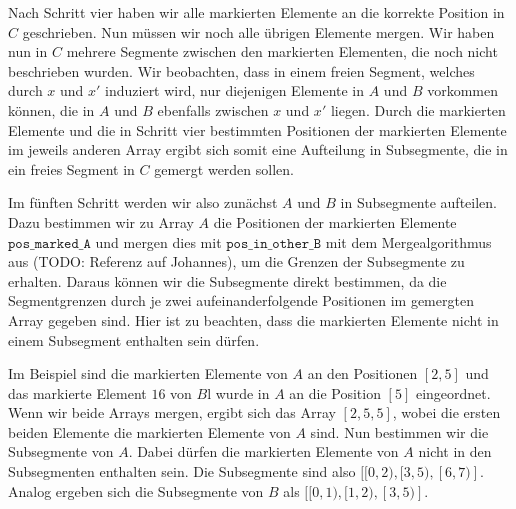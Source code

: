 Nach Schritt vier haben wir alle markierten Elemente an die korrekte Position in $C$ geschrieben. Nun müssen wir noch alle übrigen Elemente mergen. Wir haben nun in $C$ mehrere Segmente zwischen den markierten Elementen, die noch nicht beschrieben wurden. Wir beobachten, dass in einem freien Segment, welches durch $x$ und $x'$ induziert wird, nur diejenigen Elemente in $A$ und $B$ vorkommen können, die in $A$ und $B$ ebenfalls zwischen $x$ und $x'$ liegen. Durch die markierten Elemente und die in Schritt vier bestimmten Positionen der markierten Elemente im jeweils anderen Array ergibt sich somit eine Aufteilung in Subsegmente, die in ein freies Segment in $C$ gemergt werden sollen. \par
Im fünften Schritt werden wir also zunächst $A$ und $B$ in Subsegmente aufteilen. Dazu bestimmen wir zu Array $A$ die Positionen der markierten Elemente $\texttt{pos\_marked\_A}$ und mergen dies mit $\texttt{pos\_in\_other\_B}$ mit dem Mergealgorithmus aus (TODO: Referenz auf Johannes), um die Grenzen der Subsegmente zu erhalten. Daraus können wir die Subsegmente direkt bestimmen, da die Segmentgrenzen durch je zwei aufeinanderfolgende Positionen im gemergten Array gegeben sind. Hier ist zu beachten, dass die markierten Elemente nicht in einem Subsegment enthalten sein dürfen. \par
Im Beispiel sind die markierten Elemente von $A$ an den Positionen $[2,5]$ und das markierte Element $16$ von $B$l wurde in $A$ an die Position $[5]$ eingeordnet. Wenn wir beide Arrays mergen, ergibt sich das Array $[2,5,5]$, wobei die ersten beiden Elemente die markierten Elemente von $A$ sind. Nun bestimmen wir die Subsegmente von $A$. Dabei dürfen die markierten Elemente von $A$ nicht in den Subsegmenten enthalten sein. Die Subsegmente sind also $[[0,2), [3,5), [6,7)]$. Analog ergeben sich die Subsegmente von $B$ als $[[0,1), [1,2), [3,5)]$.

